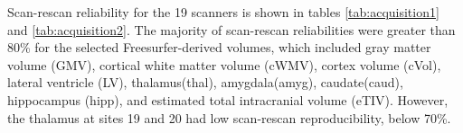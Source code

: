 Scan-rescan reliability for the 19 scanners is shown in tables \ref{tab:acquisition1} and \ref{tab:acquisition2}. The majority of scan-rescan reliabilities were greater than 80\% for the selected Freesurfer-derived volumes, which included gray matter volume (GMV), cortical white matter volume (cWMV), cortex volume (cVol), lateral ventricle (LV), thalamus(thal), amygdala(amyg), caudate(caud), hippocampus (hipp), and estimated total intracranial volume (eTIV). However, the thalamus at sites 19 and 20 had low scan-rescan reproducibility, below 70\%. %